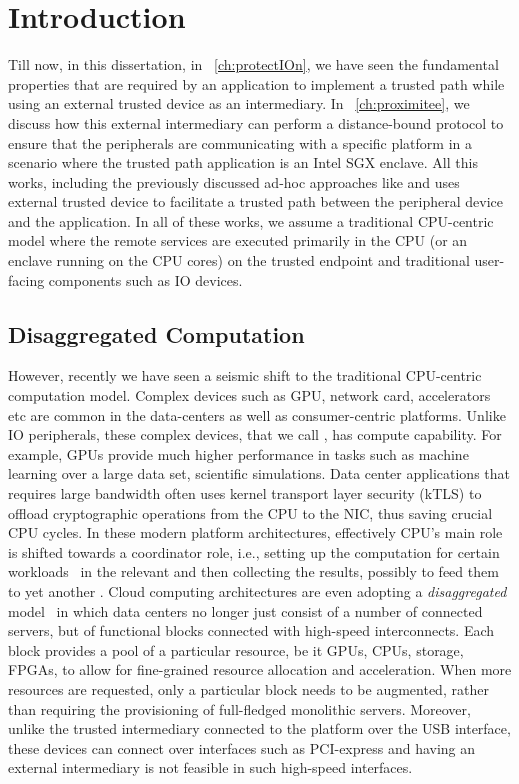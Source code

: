 \section{Introduction}
\label{sec: intro}


Till now, in this dissertation, in \protection~\ref{ch:protectIOn}, we have seen the fundamental properties that are required by an application to implement a trusted path while using an external trusted device as an intermediary. In \proximitee~\ref{ch:proximitee}, we  discuss how this external intermediary can perform a distance-bound protocol to ensure that the peripherals are communicating with a specific platform in a scenario where the trusted path application is an Intel SGX enclave. All this works, including the previously discussed ad-hoc approaches like \integrikey and \integriscreen uses external trusted device to facilitate a trusted path between the peripheral device and the application. In all of these works, we assume a traditional CPU-centric model where the remote services are executed primarily in the CPU (or an enclave running on the CPU cores) on the trusted endpoint and traditional user-facing components such as IO devices.

\subsection{Disaggregated Computation}
However, recently we have seen a seismic shift to the traditional CPU-centric computation model. Complex devices such as GPU, network card, accelerators etc are common in the data-centers as well as consumer-centric platforms. Unlike IO peripherals, these complex devices, that we call \sphw, has compute capability. For example, GPUs provide much higher performance in tasks such as machine learning over a large data set, scientific simulations. Data center applications that requires large bandwidth often uses kernel transport layer security (kTLS) to offload cryptographic operations from the CPU to the NIC, thus saving crucial CPU cycles. In these modern platform architectures, effectively CPU's main role is shifted towards a coordinator role, i.e., setting up the computation for certain workloads~\cite{spec_hw_acc} in the relevant \sphw and then collecting the results, possibly to feed them to yet another \sphw. Cloud computing architectures are even adopting a \emph{disaggregated} model~\cite{disaggregatedcomp} in which data centers no longer just consist of a number of connected servers, but of functional blocks connected with high-speed interconnects. Each block provides a pool of a particular resource, be it GPUs, CPUs, storage, FPGAs, to allow for fine-grained resource allocation and acceleration. When more resources are requested, only a particular block needs to be augmented, rather than requiring the provisioning of full-fledged monolithic servers. Moreover, unlike the trusted intermediary connected to the platform over the USB interface, these \sphw devices can connect over interfaces such as PCI-express and having an external intermediary is not feasible in such high-speed interfaces. 


